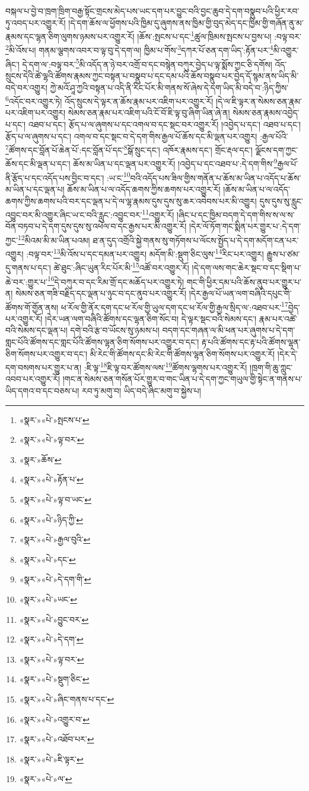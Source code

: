 བསྐལ་པ་བྱེ་བ་ཁྲག་ཁྲིག་བརྒྱ་སྟོང་གྲངས་མེད་པས་ཡང་དག་པར་བྱུང་བའི་བྱང་ཆུབ་དེ་དག་བསྣུབ་པའི་ཕྱིར་རབ་ཏུ་འབད་པར་འགྱུར་རོ། །དེ་དག་ཆོས་ལ་ཕྱོགས་པའི་ཁྱིམ་དུ་ཞུགས་ནས་ཁྱིམ་གྱི་བུད་མེད་དང་ཁྱིམ་གྱི་གཞོན་ནུ་མ་རྣམས་དང་ལྷན་ཅིག་ལུགས་ཉམས་པར་འགྱུར་རོ། །ཆོས་:སྤངས་པ་དང་\footnote{«སྣར་»«པེ་»སྤངས་པ་}ཚུལ་ཁྲིམས་སྤངས་པ་བྱས་པ། :བལྟ་བར་\footnote{«སྣར་»«པེ་»ལྟ་བར་}མི་འོས་པ། གནམ་ལྕགས་འབར་བ་ལྟ་བུ་དེ་དག་ལ། ཁྱིམ་པ་གོས་\footnote{«སྣར་»ཆོས་}དཀར་པོ་ཅན་དག་ཡིད་:རྟོན་པར་\footnote{«སྣར་»«པེ་»རྟོན་པ་}མི་འགྱུར་ཞིང་། དེ་དག་ལ་:བལྟ་བར་\footnote{«སྣར་»«པེ་»ལྟ་བ་ཡང་}མི་འདོད་ན་ཉེ་བར་འགྲོ་བ་དང་བསྙེན་བཀུར་བྱེད་པ་ལྟ་སྨོས་ཀྱང་ཅི་དགོས། འོད་སྲུངས་དེའི་ཚེ་ལྷའི་ཚོགས་རྣམས་ཀྱང་བསྟན་པ་བསྣུབ་པ་དང་དམ་པའི་ཆོས་བསྣུབ་པར་བྱེད་དོ་སྙམ་ནས་ཡིད་མི་བདེ་བར་འགྱུར། ཀྱེ་མའོ་ཤཱ་ཀྱའི་བསྟན་པ་འདི་ནི་རིང་པོར་མི་གནས་སོ་ཞེས་དེ་དག་ཡིད་མི་བདེ་བ་:ཉིད་ཀྱིས་\footnote{«སྣར་»«པེ་»ཉིད་ཀྱི་}འདོང་བར་འགྱུར་ཏེ། འོད་སྲུངས་དེ་ལྟར་ན་ཆོས་རྣམ་པར་འཇིག་པར་འགྱུར་རོ། །དེ་ལ་ཇི་ལྟར་ན་སེམས་ཅན་རྣམ་པར་འཇིག་པར་འགྱུར། སེམས་ཅན་རྣམ་པར་འཇིག་པའི་ངོ་བོ་ཇི་ལྟ་བུ་ཞིག་ཡིན་ཞེ་ན། སེམས་ཅན་རྣམས་འབྱེད་པ་དང་། འཐབ་པ་དང་། རྩོད་པ་ལ་ཞུགས་པ་དང་འགལ་བ་དང་སྡང་བར་འགྱུར་རོ། །འབྱེད་པ་དང་། འཐབ་པ་དང་། རྩོད་པ་ལ་ཞུགས་པ་དང་། འགལ་བ་དང་སྡང་བ་དེ་དག་གིས་རྒྱལ་པོ་ཆོས་དང་མི་ལྡན་པར་འགྱུར། :རྒྱལ་པོའི་\footnote{«སྣར་»«པེ་»རྒྱལ་བུའི་}ཚོགས་དང་བློན་པོ་ཆེན་པོ་:དང་བློན་པོ་དང་\footnote{«སྣར་»«པེ་»དང་}སྒོ་སྲུང་དང་། འཁོར་རྣམས་དང་། གྲོང་རྡལ་དང་། ལྗོངས་དག་ཀྱང་ཆོས་དང་མི་ལྡན་པ་དང་། ཆོས་མ་ཡིན་པ་དང་ལྡན་པར་འགྱུར་རོ། །འབྱེད་པ་དང་འཐབ་པ་:དེ་དག་གིས་\footnote{«སྣར་»«པེ་»དེ་དག་གི་}རྒྱལ་པོ་ནི་རྩོད་པ་དང་འདོད་པས་བྱིང་བ་དང་། :ཡ་ང་\footnote{«སྣར་»«པེ་»ཡང་}བའི་འདོད་པས་ཟིལ་གྱིས་གནོན་པ་ཆོས་མ་ཡིན་པ་འདོད་པ་ཆོས་མ་ཡིན་པ་དང་ལྡན་པ། ཆོས་མ་ཡིན་པ་ལ་འདོད་ཆགས་ཀྱིས་ཆགས་པར་འགྱུར་རོ། །ཆོས་མ་ཡིན་པ་ལ་འདོད་ཆགས་ཀྱིས་ཆགས་པའི་བར་དང་ལྡན་པ་དེ་ལ་ལྷ་རྣམས་དུས་དུས་སུ་ཆར་འབེབས་པར་མི་འགྱུར། དུས་དུས་སུ་རླུང་འབྱུང་བར་མི་འགྱུར་ཞིང་ཡ་ང་བའི་རླུང་:འབྱུང་བར་\footnote{«སྣར་»«པེ་»བྱུང་བར་}འགྱུར་རོ། །ཞིང་པ་དང་ཁྱིམ་བདག་དེ་དག་གིས་ས་ལ་ས་བོན་བཏབ་པ་དེ་དག་དུས་དུས་སུ་འཕེལ་བ་དང་རྒྱས་པར་མི་འགྱུར་རོ། །དེར་ལོ་ཏོག་གང་སྨིན་པར་གྱུར་པ་:དེ་དག་ཀྱང་\footnote{«སྣར་»«པེ་»དེ་དག་}མིའམ་མི་མ་ཡིན་པའམ། ཐ་ན་དུད་འགྲོའི་སྐྱེ་གནས་སུ་གཏོགས་པ་ལོངས་སྤྱོད་པ་དེ་དག་མདོག་ངན་པར་འགྱུར། :བལྟ་བར་\footnote{«སྣར་»«པེ་»ལྟ་བར་}མི་འོས་པ་དང་དམན་པར་འགྱུར། མདོག་མི་:སྡུག་ཅིང་ལུས་\footnote{«སྣར་»«པེ་»སྡུག་ཅིང་}རིང་པར་འགྱུར། རྒྱུས་པ་ཙམ་དུ་གནས་པ་དང་། ཚེ་ཐུང་:ཞིང་ཡུན་རིང་པོར་མི་\footnote{«སྣར་»«པེ་»ཞིང་གནས་པ་དང་}འཚོ་བར་འགྱུར་རོ། །དེ་དག་ལས་གང་ཆེར་སྡང་བ་དང་སྡིག་པ་ཆེ་བར་:གྱུར་པ་\footnote{«སྣར་»«པེ་»འགྱུར་བ་}དེ་བཀུར་བ་དང་རིམ་གྲོ་དང་མཆོད་པར་འགྱུར་ཏེ། གང་གི་ཕྱིར་དམ་པའི་ཆོས་ནུབ་པར་གྱུར་པ་ན། སེམས་ཅན་གཟི་བརྗིད་དང་ལྡན་པ་ཉུང་བ་དང་ནུབ་པར་འགྱུར་རོ། །དེར་རྒྱལ་པོ་ཡན་ལག་བཞིའི་དཔུང་གི་ཚོགས་གོ་གྱོན་ནས། ཕ་རོལ་གྱི་ནོར་དག་དང་ཕ་རོལ་གྱི་ཡུལ་དག་དང་ཕ་རོལ་གྱི་རྒྱལ་སྲིད་ལ་:འཐབ་པར་\footnote{«སྣར་»«པེ་»འཐོབ་པར་}བྱེད་པར་འགྱུར་རོ། །དེར་ཡན་ལག་བཞིའི་ཚོགས་དང་ལྷན་ཅིག་སོང་བ། དེ་ལྟར་སྡང་བའི་སེམས་དང་། རྣམ་པར་འཚེ་བའི་སེམས་དང་ལྡན་པ། དགེ་བའི་རྩ་བ་ཡོངས་སུ་ཉམས་པ། བདག་དང་གཞན་ལ་མི་ཕན་པར་ཞུགས་པ་དེ་དག་གླང་པོའི་ཚོགས་དང་གླང་པོའི་ཚོགས་ལྷན་ཅིག་སོགས་པར་འགྱུར་བ་དང་། རྟ་པའི་ཚོགས་དང་རྟ་པའི་ཚོགས་ལྷན་ཅིག་སོགས་པར་འགྱུར་བ་དང་། མི་རེང་གི་ཚོགས་དང་མི་རེང་གི་ཚོགས་ལྷན་ཅིག་སོགས་པར་འགྱུར་རོ། །དེར་དེ་དག་བསགས་པར་གྱུར་པ་ན། :ཇི་ལྟ་\footnote{«སྣར་»«པེ་»ཇི་ལྟར་}ཇི་ལྟ་བར་ཚོགས་ལས་\footnote{«སྣར་»«པེ་»ལ་}ཚོགས་ལྷགས་པར་འགྱུར་རོ། །ཁྲག་གི་ཆུ་ཀླུང་འབབ་པར་འགྱུར་རོ། །གང་ན་སེམས་ཅན་གསོན་པོར་གྱུར་བ་གང་ཡིན་པ་དེ་དག་ཀྱང་གཡུལ་གྱི་སྟེང་ན་གནས་པ་ཡིད་དགའ་བ་དང་བཅས་པ། རབ་ཏུ་མགུ་བ། ཡིད་བདེ་ཞིང་མགུ་བ་སྐྱེས་པ། 